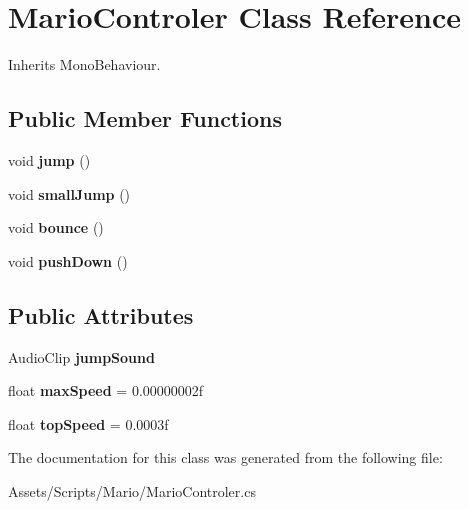 \hypertarget{class_mario_controler}{\section{Mario\-Controler Class Reference}
\label{class_mario_controler}
}


Inherits Mono\-Behaviour.

\subsection*{Public Member Functions}
\begin{DoxyCompactItemize}
\item 
\hypertarget{class_mario_controler_ad23a3e6b058d02aeb6990677377d6ffc}{void {\bfseries jump} ()}\label{class_mario_controler_ad23a3e6b058d02aeb6990677377d6ffc}

\item 
\hypertarget{class_mario_controler_a7aa23bc410327b0d9557383b27de3b7b}{void {\bfseries small\-Jump} ()}\label{class_mario_controler_a7aa23bc410327b0d9557383b27de3b7b}

\item 
\hypertarget{class_mario_controler_a75ac7cb895431d1c0bbaa13f20aaa5b9}{void {\bfseries bounce} ()}\label{class_mario_controler_a75ac7cb895431d1c0bbaa13f20aaa5b9}

\item 
\hypertarget{class_mario_controler_a5ab6f3fe2c9a638af77e2d28956ae453}{void {\bfseries push\-Down} ()}\label{class_mario_controler_a5ab6f3fe2c9a638af77e2d28956ae453}

\end{DoxyCompactItemize}
\subsection*{Public Attributes}
\begin{DoxyCompactItemize}
\item 
\hypertarget{class_mario_controler_aaac5e1dbd1b95c3f2efed9da234407bc}{Audio\-Clip {\bfseries jump\-Sound}}\label{class_mario_controler_aaac5e1dbd1b95c3f2efed9da234407bc}

\item 
\hypertarget{class_mario_controler_aa863a19a523575416c2d16e26a7ce043}{float {\bfseries max\-Speed} = 0.\-00000002f}\label{class_mario_controler_aa863a19a523575416c2d16e26a7ce043}

\item 
\hypertarget{class_mario_controler_a2bf560538a345feac6a6e534f1a63d9c}{float {\bfseries top\-Speed} = 0.\-0003f}\label{class_mario_controler_a2bf560538a345feac6a6e534f1a63d9c}

\end{DoxyCompactItemize}


The documentation for this class was generated from the following file\-:\begin{DoxyCompactItemize}
\item 
Assets/\-Scripts/\-Mario/Mario\-Controler.\-cs\end{DoxyCompactItemize}
